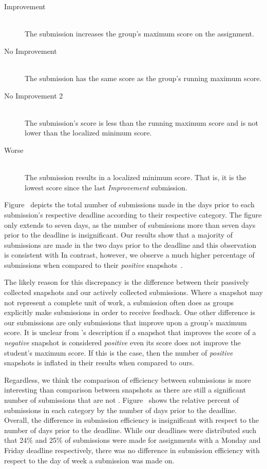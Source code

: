 \begin{description}
  \item[Improvement] \hfill \\ The submission increases the group's maximum
    score on the assignment.
  \item[No Improvement] \hfill \\ The submission has the same score as the
    group's running maximum score.
  \item[No Improvement 2] \hfill \\ The submission's score is less than the
    running maximum score and is not lower than the localized minimum score.
  \item[Worse] \hfill \\ The submission results in a localized minimum
    score. That is, it is the lowest score since the last \emph{Improvement}
    submission.
\end{description}

Figure~ depicts the total number of submissions
made in the days prior to each submission's respective deadline according to
their respective category. The figure only extends to seven days, as the number
of submissions more than seven days prior to the deadline is insignificant. Our
results show that a majority of submissions are made in the two days prior to
the deadline and this observation is consistent with \spacco{} In contrast,
however, we observe a much higher percentage of \imp{} submissions when
compared to their \emph{positive}
snapshots~\cite{Spacco:2013:TIP:2462476.2465594}.

The likely reason for this discrepancy is the difference between their
passively collected snapshots and our actively collected submissions. Where a
snapshot may not represent a complete unit of work, a submission often does as
groups explicitly make submissions in order to receive feedback. One other
difference is our \imp{} submissions are only submissions that improve upon a
group's maximum score. It is unclear from \spacco{}'s description if a snapshot
that improves the score of a \emph{negative} snapshot is considered
\emph{positive} even its score does not improve the student's maximum score. If
this is the case, then the number of \emph{positive} snapshots is inflated in
their results when compared to ours.

Regardless, we think the comparison of efficiency between submissions is more
interesting than comparison between snapshots as there are still a significant
number of submissions that are not
\imp{}. Figure~ shows the relative percent of
submissions in each category by the number of days prior to the
deadline. Overall, the difference in submission efficiency is insignificant
with respect to the number of days prior to the deadline. While our deadlines
were distributed such that 24\% and 25\% of submissions were made for
assignments with a Monday and Friday deadline respectively, there was no
difference in submission efficiency with respect to the day of week a
submission was made on.

